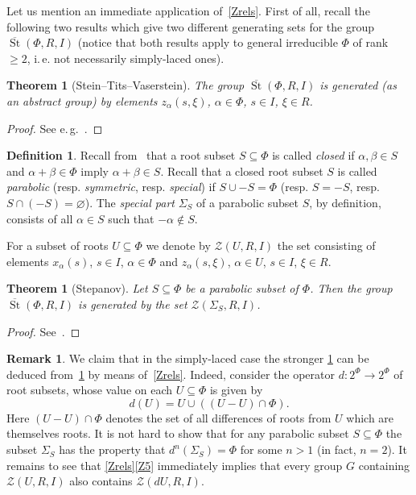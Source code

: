 \documentclass[oneside, 8pt]{amsart}
\newtheorem{externaltheorem}[lemma]{Theorem}
\theoremstyle{remark}
\theoremstyle{definition}
\numberwithin{lemma}{section}
\numberwithin{prop}{section}
\numberwithin{corollary}{section}
\numberwithin{externaltheorem}{section}
\newtheorem{df}[lemma]{Definition} \Crefname{df}{Definition}{Definitions}
\newtheorem{rem}[lemma]{Remark}
\DeclareMathOperator{\St}{St}
\numberwithin{equation}{section}
\begin{document}
Let us mention an immediate application of~\cref{Zrels}.
First of all, recall the following two results which give two different generating sets for the group $\overline{\St}(\Phi, R, I)$ (notice that both results apply to general irreducible $\Phi$ of rank $\geq 2$, i.\,e. not necessarily simply-laced ones).
\begin{externaltheorem}[Stein--Tits--Vaserstein] \label{thm:Tits} The group $\overline{\St}(\Phi, R, I)$ is generated (as an abstract group) by elements $z_\alpha(s, \xi)$, $\alpha \in \Phi$, $s \in I$, $\xi \in R$. \end{externaltheorem} \begin{proof} See e.\,g.~\cite[Theorem 2]{Va86}. \end{proof}

\begin{df} \label{df:root-subsets}
Recall from~\cite[Ch.~VI, \S~1.7]{Bou81} that a root subset $S \subseteq \Phi$ is called {\it closed} if $\alpha, \beta \in S$ and $\alpha+\beta\in \Phi$ imply $\alpha + \beta \in S$. 
Recall that a closed root subset $S$ is called {\it parabolic} (resp. {\it symmetric}, resp. {\it special}) if $S \cup -S = \Phi$ (resp. $S = -S$, resp. $S \cap (-S) = \varnothing$).
The {\it special part} $\Sigma_S$ of a parabolic subset $S$, by definition, consists of all $\alpha \in S$ such that $-\alpha \not\in S$.
\end{df}

For a subset of roots $U \subseteq \Phi$ we denote by $\mathcal{Z}(U, R, I)$ the set consisting of elements $x_\alpha(s)$, $s \in I$, $\alpha \in \Phi$ and $z_\alpha(s, \xi)$, $\alpha \in U$, $s\in I$, $\xi \in R$.
\begin{externaltheorem}[Stepanov] \label{thm:Stepanov} 
Let $S \subseteq \Phi$ be a parabolic subset of $\Phi$. Then the group $\overline{\St}(\Phi, R, I)$ is generated by the set $\mathcal{Z}(\Sigma_S, R, I)$.
 \end{externaltheorem} \begin{proof} See~\cite[Lemma~4]{S15}. \end{proof}

\begin{rem} We claim that in the simply-laced case the stronger \cref{thm:Stepanov} can be deduced from~\cref{thm:Tits} by means of~\cref{Zrels}. Indeed, consider the operator $d \colon 2^\Phi \to 2^\Phi$ of root subsets, whose value on each $U \subseteq \Phi$ is given by \[d(U) = U \cup \left((U - U)\cap \Phi\right).\]
Here $(U-U) \cap \Phi$ denotes the set of all differences of roots from $U$ which are themselves roots. It is not hard to show that for any parabolic subset $S \subseteq \Phi$ the subset $\Sigma_S$ has the property that $d^n(\Sigma_S) = \Phi$ for some $n>1$ (in fact, $n=2$). It remains to see that \cref{Zrels}\ref{Z5} immediately implies that every group $G$ containing $\mathcal{Z}(U, R, I)$ also contains $\mathcal{Z}(dU, R, I)$. \end{rem}
\end{document}
